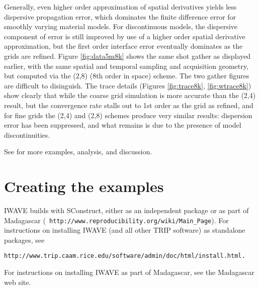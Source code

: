 Generally, even higher order approximation of spatial derivatives
yields less dispersive propagation error, which dominates the finite
difference error for smoothly varying material models. For
discontinuous models, the dispersive component of error is still
improved by use of a higher order spatial derivative approximation,
but the first order interface error eventually dominates as the grids
are refined. Figure \ref{fig:data5m8k} shows the same shot gather as
displayed earlier, with the same spatial and temporal sampling and
acquisition geometry, but computed via the (2,8) (8th order in space)
scheme. The two gather figures are difficult to disinguish. The trace
details (Figures \ref{fig:trace8k}, \ref{fig:wtrace8k}) show clearly
that while the coarse grid simulation is more accurate than the (2,4)
result, but the convergence rate stalls out to 1st order as the grid
as refined, and for fine grids the (2,4) and (2,8) schemes produce
very similar results: dispersion error has been suppressed, and what
remains is due to the presence of model discontinuities.

See
\cite[]{SymesVdovina:09} for more examples, analysis, and discussion.

\section{Creating the examples}
IWAVE builds with SConstruct, either as an
independent package or as part of Madagascar ({\tt
  http://www.reproducibility.org/wiki/Main\_Page}). For instructions on
installing IWAVE (and all other TRIP software) as standalone packages, see 
\begin{verbatim}
http://www.trip.caam.rice.edu/software/admin/doc/html/install.html.
\end{verbatim}
For instructions on installing IWAVE as part of Madagascar, see the
Madagascar web site.

